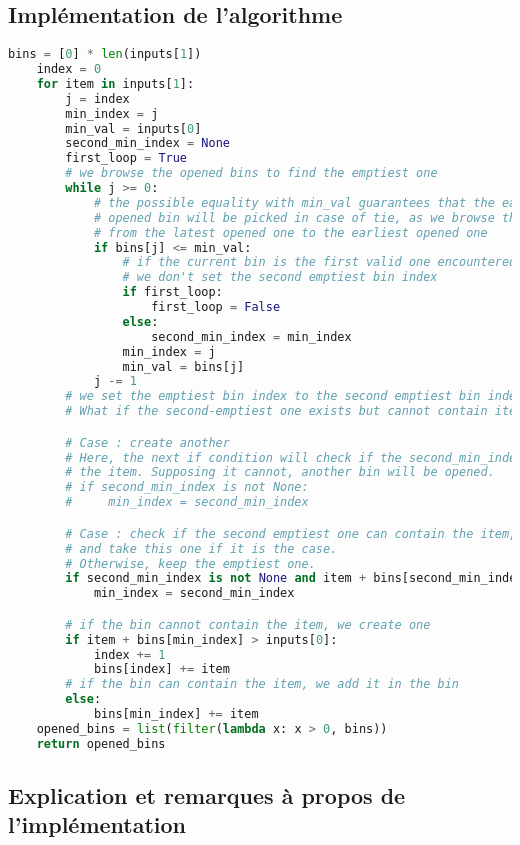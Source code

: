 \documentclass{article}
\begin{document}
\subsection{Implémentation de l'algorithme}
\begin{lstlisting}[language=Python, frame=single]
    bins = [0] * len(inputs[1])
    index = 0
    for item in inputs[1]:
        j = index
        min_index = j
        min_val = inputs[0]
        second_min_index = None
        first_loop = True
        # we browse the opened bins to find the emptiest one
        while j >= 0:
            # the possible equality with min_val guarantees that the earliest
            # opened bin will be picked in case of tie, as we browse the bins
            # from the latest opened one to the earliest opened one
            if bins[j] <= min_val:
                # if the current bin is the first valid one encountered,
                # we don't set the second emptiest bin index
                if first_loop:
                    first_loop = False
                else:
                    second_min_index = min_index
                min_index = j
                min_val = bins[j]
            j -= 1
        # we set the emptiest bin index to the second emptiest bin index if it exists
        # What if the second-emptiest one exists but cannot contain item ?

        # Case : create another
        # Here, the next if condition will check if the second_min_index can contain
        # the item. Supposing it cannot, another bin will be opened.
        # if second_min_index is not None:
        #     min_index = second_min_index

        # Case : check if the second emptiest one can contain the item,
        # and take this one if it is the case.
        # Otherwise, keep the emptiest one.
        if second_min_index is not None and item + bins[second_min_index] < inputs[0]:
            min_index = second_min_index

        # if the bin cannot contain the item, we create one
        if item + bins[min_index] > inputs[0]:
            index += 1
            bins[index] += item
        # if the bin can contain the item, we add it in the bin
        else:
            bins[min_index] += item
    opened_bins = list(filter(lambda x: x > 0, bins))
    return opened_bins
\end{lstlisting}

\subsection{Explication et remarques à propos de l'implémentation}
\end{document}
